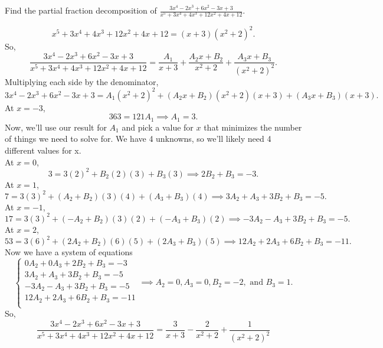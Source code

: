 \begin{example}
	Find the partial fraction decomposition of $\frac{3x^4-2x^3+6x^2-3x+3}{x^5+3x^4+4x^3+12x^2+4x+12}$.
\end{example}
\begin{equation*}
	x^5+3x^4+4x^3+12x^2+4x+12 = (x+3)(x^2+2)^2.
\end{equation*}
So,
\begin{equation*}
	\frac{3x^4-2x^3+6x^2-3x+3}{x^5+3x^4+4x^3+12x^2+4x+12} = \frac{A_1}{x+3}+\frac{A_2x+B_2}{x^2+2}+\frac{A_3x+B_3}{(x^2+2)^2}.
\end{equation*}
Multiplying each side by the denominator,
\begin{equation*}
	3x^4-2x^3+6x^2-3x+3 = A_1(x^2+2)^2+(A_2x+B_2)(x^2+2)(x+3)+(A_3x+B_3)(x+3).
\end{equation*}
At $x=-3$,
\begin{equation*}
	363 = 121A_1 \implies A_1 = 3.
\end{equation*}
Now, we'll use our result for $A_1$ and pick a value for $x$ that minimizes the number of things we need to solve for.
We have 4 unknowns, so we'll likely need 4 different values for x.\\
At $x=0$,
\begin{equation*}
	3 = 3(2)^2 + B_2(2)(3)+B_3(3) \implies 2B_2 + B_3 = -3.
\end{equation*}
At $x=1$,
\begin{equation*}
	7 = 3(3)^2 + (A_2+B_2)(3)(4) + (A_3+B_3)(4) \implies 3A_2 + A_3 + 3B_2 + B_3 = -5.
\end{equation*}
At $x=-1$,
\begin{equation*}
	17 = 3(3)^2 + (-A_2+B_2)(3)(2) + (-A_3+B_3)(2) \implies -3A_2 - A_3 + 3B_2 + B_3 = -5.
\end{equation*}
At $x=2$,
\begin{equation*}
	53 = 3(6)^2 + (2A_2+B_2)(6)(5) + (2A_3+B_3)(5) \implies 12A_2 + 2A_3 + 6B_2 + B_3 = -11.
\end{equation*}
Now we have a system of equations
\begin{equation*}
	\begin{cases}
		0A_2  + 0A_3 + 2B_2 + B_3 = -3 \\
		3A_2  + A_3  + 3B_2 + B_3 = -5 \\
		-3A_2 - A_3  + 3B_2 + B_3 = -5 \\
		12A_2 + 2A_3 + 6B_2 + B_3 = -11 \\
	\end{cases}
	\implies A_2 = 0, A_3 = 0, B_2 = -2, \text{ and } B_3 = 1.
\end{equation*}
So,
\begin{equation*}
	\frac{3x^4-2x^3+6x^2-3x+3}{x^5+3x^4+4x^3+12x^2+4x+12} = \frac{3}{x+3}-\frac{2}{x^2+2}+\frac{1}{(x^2+2)^2}
\end{equation*}